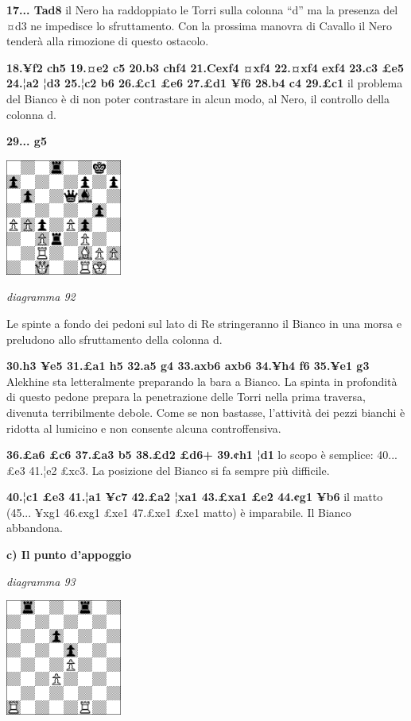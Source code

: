 \documentclass[
]{article}
\begin{document}
\textbf{17... Tad8} il Nero ha raddoppiato le Torri sulla colonna ``d''
ma la presenza del ¤d3 ne impedisce lo sfruttamento. Con la prossima
manovra di Cavallo il Nero tenderà alla rimozione di questo ostacolo.

\textbf{18.¥f2 ch5 19.¤e2 c5 20.b3 chf4 21.Cexf4 ¤xf4 22.¤xf4 exf4 23.c3
£e5 24.¦a2 ¦d3 25.¦c2 b6 26.£c1 £e6 27.£d1 ¥f6 28.b4 c4 29.£c1} il
problema del Bianco è di non poter contrastare in alcun modo, al Nero,
il controllo della colonna d.

\textbf{29... g5}

\includegraphics[width=1.5in,height=1.5in]{vertopal_109f12be458a423d8f3cc838880eaea2/media/image92.png}

\emph{diagramma 92}

Le spinte a fondo dei pedoni sul lato di Re stringeranno il Bianco in
una morsa e preludono allo sfruttamento della colonna d.

\textbf{30.h3 ¥e5 31.£a1 h5 32.a5 g4 33.axb6 axb6 34.¥h4 f6 35.¥e1 g3}
Alekhine sta letteralmente preparando la bara a Bianco. La spinta in
profondità di questo pedone prepara la penetrazione delle Torri nella
prima traversa, divenuta terribilmente debole. Come se non bastasse,
l'attività dei pezzi bianchi è ridotta al lumicino e non consente alcuna
controffensiva.

\textbf{36.£a6 £c6 37.£a3 b5 38.£d2 £d6+ 39.¢h1 ¦d1} lo scopo è
semplice: 40... £e3 41.¦e2 £xc3. La posizione del Bianco si fa sempre
più difficile.

\textbf{40.¦c1 £e3 41.¦a1 ¥c7 42.£a2 ¦xa1 43.£xa1 £e2 44.¢g1 ¥b6} il
matto (45... ¥xg1 46.¢xg1 £xe1 47.£xe1 £xe1 matto) è imparabile. Il
Bianco abbandona.

\textbf{c) Il punto d'appoggio}

\emph{diagramma 93}

\includegraphics[width=1.49583in,height=1.49583in]{vertopal_109f12be458a423d8f3cc838880eaea2/media/image93.png}
\end{document}
